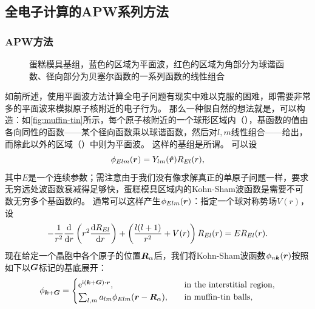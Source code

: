 \subsection{全电子计算的APW系列方法}\label{sec:dft-lapw}

\subsubsection{APW方法}

\begin{figure}
    \centering
    
    \caption{蛋糕模具基组，蓝色的区域为平面波，红色的区域为角部分为球谐函数、径向部分为贝塞尔函数的一系列函数的线性组合}
    \label{fig:muffin-tin}
\end{figure}

如前所述，使用平面波方法计算全电子问题有现实中难以克服的困难，即需要非常多的平面波来模拟原子核附近的电子行为。
那么一种很自然的想法就是，可以构造：如\autoref{fig:muffin-tin}所示，每个原子核附近的一个球形区域内（），基函数的值由各向同性的函数——某个径向函数乘以球谐函数，然后对$l, m$线性组合——给出，而除此以外的区域（）中则为平面波。
这样的基组是所谓。
可以设
\begin{equation}
    \phi_{Elm}(\vb*{r}) = Y_{lm}(\vu*{r}) R_{El}(r),
\end{equation}
其中$E$是一个连续参数；需注意由于我们没有像求解真正的单原子问题一样，要求无穷远处波函数衰减得足够快，蛋糕模具区域内的Kohn-Sham波函数是需要不可数无穷多个基函数的。
通常可以这样产生$\phi_{Elm}(\vb*{r})$：指定一个球对称势场$V(r)$，设
\begin{equation}
    - \frac{1}{r^2} \dv{r} \left( r^2 \dv{R_{El}}{r} \right) + \left( \frac{l (l+1)}{r^2} + V(r) \right) R_{El}(r) = E R_{El}(r).
    \label{eq:apw-muffin-tin-inside}
\end{equation}
现在给定一个晶胞中各个原子的位置$\vb*{R}_\alpha$后，我们将Kohn-Sham波函数$\phi_{n \vb*{k}}(\vb*{r})$按照如下以$\vb*{G}$标记的基底展开：
\begin{equation}
    \phi_{\vb*{k} + \vb*{G}} = \begin{cases}
        \mathrm{e}^{\mathrm{i} (\vb*{k} + \vb*{G}) \cdot \vb*{r}}, \quad &\text{in the interstitial region}, \\
        \sum_{l, m} a_{lm} \phi_{Elm}(\vb*{r} - \vb*{R}_\alpha) , \quad &\text{in muffin-tin balls},
    \end{cases}
    \label{eq:apw-basis}
\end{equation}
